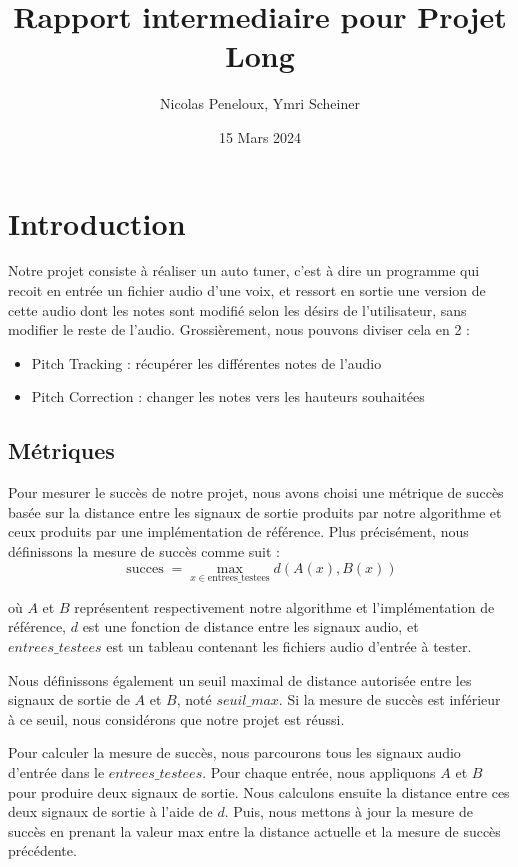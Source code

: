 \documentclass{article}
\title{Rapport intermediaire pour Projet Long}
\author{Nicolas Peneloux, Ymri Scheiner}
\date{15 Mars 2024}
\begin{document}
\maketitle

\section{Introduction}

Notre projet consiste à réaliser un auto tuner, c'est à dire un programme qui recoit en entrée un fichier audio d'une voix, et ressort en sortie une version de cette audio dont les notes sont modifié selon les désirs de l'utilisateur, sans modifier le reste de l'audio. Grossièrement, nous pouvons diviser cela en 2 : 
\begin{itemize}
  \item Pitch Tracking : récupérer les différentes notes de l'audio
  \item Pitch Correction : changer les notes vers les hauteurs souhaitées
\end{itemize}
\par 

\subsection*{Métriques}
Pour mesurer le succès de notre projet, nous avons choisi une métrique de succès basée sur la distance entre les signaux de sortie produits par notre algorithme et ceux produits par une 
implémentation de référence. Plus précisément, nous définissons la mesure de succès comme suit :
\begin{equation}
    \operatorname{succes} = \max_{x \in \mathrm{entrees\_testees}} d(A(x), B(x))
\end{equation}
\par

où \( \mathit{A} \) et \( \mathit{B} \) représentent respectivement notre algorithme et l'implémentation de référence, \(\textit{d}\) est une fonction de distance entre les signaux audio, et \(\mathit{entrees\_testees}\) est un tableau contenant les fichiers audio d'entrée à tester.
\par
Nous définissons également un seuil maximal de distance autorisée entre les signaux de sortie de \(\textit{A}\) et \(\textit{B}\), noté \(\textit{seuil\_max}\). Si la mesure de succès est inférieur
à ce seuil, nous considérons que notre projet est réussi.

Pour calculer la mesure de succès, nous parcourons tous les signaux audio d'entrée dans le \( \textit{entrees\_testees} \). Pour chaque entrée, nous appliquons \( \textit{A} \) et \( \textit{B} \) pour produire deux signaux de sortie. Nous calculons ensuite la distance entre ces deux signaux de sortie à l'aide de \( \textit{d} \). Puis, nous mettons à jour la mesure de succès en prenant la valeur max entre la distance actuelle et la mesure de succès précédente.
\end{document}
